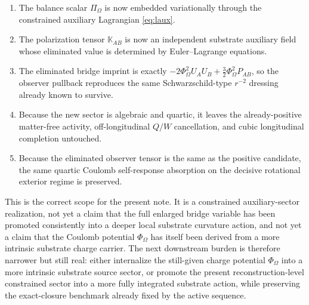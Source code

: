 \documentclass[11pt]{article}
\newcommand{\ProjSub}{P}
\newcommand{\FlowPot}{\Phi_\Omega}
\newcommand{\BalanceField}{\Pi_\Omega}
\newcommand{\AuxPol}{\mathbb K}
\begin{document}
\begin{enumerate}
    \item The balance scalar \(\BalanceField\) is now embedded variationally through the constrained auxiliary Lagrangian \eqref{eq:laux}.
    \item The polarization tensor \(\AuxPol_{AB}\) is now an independent substrate auxiliary field whose eliminated value is determined by Euler--Lagrange equations.
    \item The eliminated bridge imprint is exactly \(-2\FlowPot^2U_AU_B+\tfrac32\FlowPot^2\ProjSub_{AB}\), so the observer pullback reproduces the same Schwarzschild-type \(r^{-2}\) dressing already known to survive.
    \item Because the new sector is algebraic and quartic, it leaves the already-positive matter-free activity, off-longitudinal \(Q/W\) cancellation, and cubic longitudinal completion untouched.
    \item Because the eliminated observer tensor is the same as the positive candidate, the same quartic Coulomb self-response absorption on the decisive rotational exterior regime is preserved.
\end{enumerate}

This is the correct scope for the present note. It is a constrained auxiliary-sector realization, not yet a claim that the full enlarged bridge variable has been promoted consistently into a deeper local substrate curvature action, and not yet a claim that the Coulomb potential \(\FlowPot\) has itself been derived from a more intrinsic substrate charge carrier. The next downstream burden is therefore narrower but still real: either internalize the still-given charge potential \(\FlowPot\) into a more intrinsic substrate source sector, or promote the present reconstruction-level constrained sector into a more fully integrated substrate action, while preserving the exact-closure benchmark already fixed by the active sequence.
\end{document}
